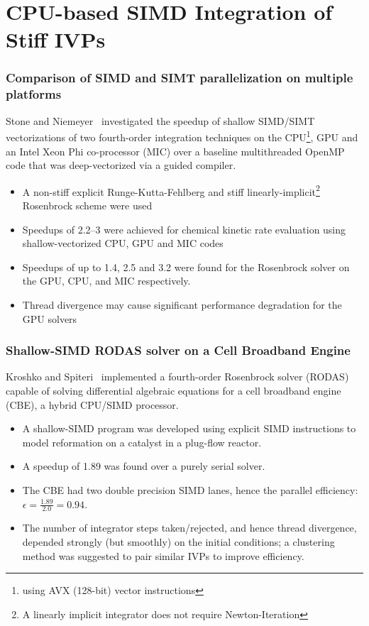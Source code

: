 \documentclass{beamer}
\newcounter{stiff}
\begin{document}
\section{CPU-based SIMD Integration of Stiff IVPs}

\begin{frame}[allowframebreaks]
 \frametitle{Comparison of SIMD and SIMT parallelization on multiple platforms}
 Stone and Niemeyer~ investigated the speedup of shallow SIMD\slash SIMT vectorizations of two fourth-order integration techniques on the CPU\footnote{using AVX (128-bit) vector instructions}, GPU and an Intel Xeon Phi co-processor (MIC) over a baseline multithreaded OpenMP code that was deep-vectorized via a guided compiler.
 \begin{itemize}
  \item A non-stiff explicit Runge-Kutta-Fehlberg and stiff linearly-implicit\footnote{A linearly implicit integrator does not require Newton-Iteration} Rosenbrock scheme were used
  \item Speedups of \SIrange{2.2}{3}{\times} were achieved for chemical kinetic rate evaluation using shallow-vectorized CPU, GPU and MIC codes
  \item Speedups of up to \SI{1.4}{\times}, \SI{2.5}{\times} and \SI{3.2}{\times} were found for the Rosenbrock solver on the GPU, CPU, and MIC respectively.
  \item Thread divergence may cause significant performance degradation for the GPU solvers
 \end{itemize}
\end{frame}

\begin{frame}
 \frametitle{Shallow-SIMD RODAS solver on a Cell Broadband Engine}
 Kroshko and Spiteri~ implemented a fourth-order Rosenbrock solver (RODAS) capable of solving differential algebraic equations for a cell broadband engine (CBE), a hybrid CPU\slash SIMD processor.
 \begin{itemize}
  \item A shallow-SIMD program was developed using explicit SIMD instructions to model  reformation on a  catalyst in a plug-flow reactor.
  \item A speedup of \SI{1.89}{\times} was found over a purely serial solver.
  \item The CBE had two double precision SIMD lanes, hence the parallel efficiency: $\epsilon = \frac{1.89}{2.0} = 0.94$.
  \item The number of integrator steps taken\slash rejected, and hence thread divergence, depended strongly (but smoothly) on the initial conditions; a clustering method was suggested to pair similar IVPs to improve efficiency.
 \end{itemize}
\end{frame}
\end{document}

